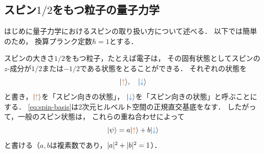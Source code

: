 \documentclass[
]{sotsu}
\newcommand{\bitone}{\mathcolor{fire}{\uparrow}}
\newcommand{\bittwo}{\mathcolor{water}{\downarrow}}
\let\upspin\bitone
\let\dwspin\bittwo
\begin{document}
\subsection{スピン\texorpdfstring{$1/2$}{½}をもつ粒子の量子力学}
\label{sec:spin-state}

はじめに量子力学におけるスピンの取り扱い方について述べる．
以下では簡単のため，
換算プランク定数$\hbar = 1$とする．

スピンの大きさ$1/2$をもつ粒子，たとえば電子は，
その固有状態としてスピンの$z$-成分が$1/2$または$-1/2$である状態をとることができる．
それぞれの状態を
\begin{equation}
    \label{eq:spin-basis}
    \ket{\upspin}, \quad \ket{\dwspin}
\end{equation}
と書き，$\ket{\upspin}$を「スピン向きの状態」，
$\ket{\dwspin}$を「スピン向きの状態」と呼ぶことにする．
\cref{eq:spin-basis}は2次元ヒルベルト空間の正規直交基底をなす．
したがって，一般のスピン状態は，
これらの重ね合わせによって
\begin{equation}
    \label{eq:spin-state}
    \ket{\psi} = a \ket{\upspin} + b \ket{\dwspin}
\end{equation}
と書ける（$a, b$は複素数であり，$\lvert a\rvert^2 + \lvert b\rvert^2 = 1$）．
\end{document}
